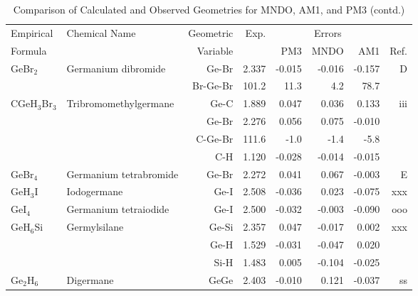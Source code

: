 \begin{table}
\caption{\label{geotabr}Comparison of Calculated and Observed Geometries for 
MNDO, AM1, and PM3 (contd.)}
\begin{center}
\compresstable
\begin{tabular}{llrrrrrr}
 Empirical  & Chemical Name &  Geometric &  Exp. & \multicolumn{3}{c}{Errors} & \\
  Formula   &               &  Variable &        & PM3  & MNDO  &  AM1 & Ref.\\
\hline
 GeBr$_2$       & Germanium dibromide                &Ge-Br          &     2.337   &    -0.015 &    -0.016 &    -0.157 &     D \\
             &                                    &Br-Ge-Br     &     101.2   &      11.3 &       4.2 &      78.7   &       \\
 CGeH$_3$Br$_3$    & Tribromomethylgermane              &Ge-C           &     1.889   &     0.047 &     0.036 &     0.133 &   iii \\
             &                                    &Ge-Br          &     2.276   &     0.056 &     0.075 &    -0.010 &       \\
             &                                    &C-Ge-Br      &     111.6   &      -1.0 &      -1.4 &      -5.8   &       \\
             &                                    &C-H            &     1.120   &    -0.028 &    -0.014 &    -0.015 &       \\
 GeBr$_4$       & Germanium tetrabromide             &Ge-Br          &     2.272   &     0.041 &     0.067 &    -0.003 &     E \\
 GeH$_3$I       & Iodogermane                        &Ge-I           &     2.508   &    -0.036 &     0.023 &    -0.075 &   xxx \\
 GeI$_4$        & Germanium tetraiodide              &Ge-I           &     2.500   &    -0.032 &    -0.003 &    -0.090 &   ooo \\
 GeH$_6$Si      & Germylsilane                       &Ge-Si          &     2.357   &     0.047 &    -0.017 &     0.002 &   xxx \\
             &                                    &Ge-H           &     1.529   &    -0.031 &    -0.047 &     0.020 &       \\
             &                                    &Si-H           &     1.483   &     0.005 &    -0.104 &    -0.025 &       \\
 Ge$_2$H$_6$       & Digermane                          &GeGe           &     2.403   &    -0.010 &     0.121 &    -0.037 &    ss \\

\end{tabular}
\end{center}
\end{table}

